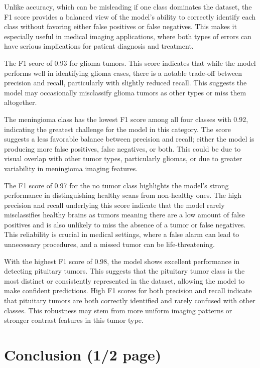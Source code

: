 \documentclass[conference]{IEEEtran}
\begin{document}
Unlike accuracy, which can be misleading if one class dominates the dataset, the F1 score provides a balanced view of the model's ability to correctly identify each class without favoring either false positives or false negatives. This makes it especially useful in medical imaging applications, where both types of errors can have serious implications for patient diagnosis and treatment.

The F1 score of 0.93 for glioma tumors. This score indicates that while the model performs well in identifying glioma cases, there is a notable trade-off between precision and recall, particularly with slightly reduced recall. This suggests the model may occasionally misclassify glioma tumors as other types or miss them altogether.

The meningioma class has the lowest F1 score among all four classes with 0.92, indicating the greatest challenge for the model in this category. The score suggests a less favorable balance between precision and recall; either the model is producing more false positives, false negatives, or both. This could be due to visual overlap with other tumor types, particularly gliomas, or due to greater variability in meningioma imaging features. 

The F1 score of 0.97 for the no tumor class highlights the model’s strong performance in distinguishing healthy scans from non-healthy ones. The high precision and recall underlying this score indicate that the model rarely misclassifies healthy brains as tumors meaning there are a low amount of false positives and is also unlikely to miss the absence of a tumor or false negatives. This reliability is crucial in medical settings, where a false alarm can lead to unnecessary procedures, and a missed tumor can be life-threatening.

With the highest F1 score of 0.98, the model shows excellent performance in detecting pituitary tumors. This suggests that the pituitary tumor class is the most distinct or consistently represented in the dataset, allowing the model to make confident predictions. High F1 scores for both precision and recall indicate that pituitary tumors are both correctly identified and rarely confused with other classes. This robustness may stem from more uniform imaging patterns or stronger contrast features in this tumor type.

\section{\large Conclusion (1/2 page)}
\end{document}
